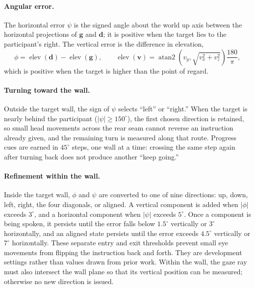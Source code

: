 \paragraph{Angular error.} The horizontal error $\psi$ is the signed angle about the world up axis between the horizontal projections of $\mathbf{g}$ and $\mathbf{d}$; it is positive when the target lies to the participant's right. The vertical error is the difference in elevation,
\begin{equation}
\phi=\operatorname{elev}(\mathbf{d})-\operatorname{elev}(\mathbf{g}),\qquad
\operatorname{elev}(\mathbf{v})=\operatorname{atan2}\!\left(v_y,\sqrt{v_x^2+v_z^2}\right)\frac{180}{\pi},
\end{equation}
which is positive when the target is higher than the point of regard.

\paragraph{Turning toward the wall.} Outside the target wall, the sign of $\psi$ selects ``left'' or ``right.'' When the target is nearly behind the participant ($|\psi|\geq150^\circ$), the first chosen direction is retained, so small head movements across the rear seam cannot reverse an instruction already given, and the remaining turn is measured along that route. Progress cues are earned in $45^\circ$ steps, one wall at a time: crossing the same step again after turning back does not produce another ``keep going.''

\paragraph{Refinement within the wall.} Inside the target wall, $\phi$ and $\psi$ are converted to one of nine directions: up, down, left, right, the four diagonals, or aligned. A vertical component is added when $|\phi|$ exceeds $3^\circ$, and a horizontal component when $|\psi|$ exceeds $5^\circ$. Once a component is being spoken, it persists until the error falls below $1.5^\circ$ vertically or $3^\circ$ horizontally, and an aligned state persists until the error exceeds $4.5^\circ$ vertically or $7^\circ$ horizontally. These separate entry and exit thresholds prevent small eye movements from flipping the instruction back and forth. They are development settings rather than values drawn from prior work. Within the wall, the gaze ray must also intersect the wall plane so that its vertical position can be measured; otherwise no new direction is issued.

